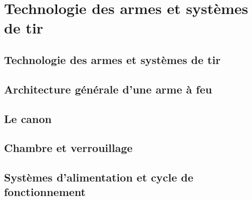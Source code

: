 
\chapter*{}

\cleardoublepage
{}
\renewcommand{\CurrentPartColor}{Part3Color}
\renewcommand{\CurrentPartNumber}{Partie 03}
\renewcommand{\CurrentPartName}{Technologie des armes et systèmes de tir}
\renewcommand{\CurrentChapterType}{Chapitre}


\part{Technologie des armes et systèmes de tir}

    \chapter{Technologie des armes et systèmes de tir}
    \label{chap:introduction_aux_armes}
    

    \chapter{Architecture générale d'une arme à feu}
    \label{chap:architecture_generale}
    

    \chapter{Le canon}
    \label{chap:canon}
    

    \chapter{Chambre et verrouillage}
    \label{chap:chambre_et_verrouillage}
    

    \chapter{Systèmes d'alimentation et cycle de fonctionnement}
    \label{chap:alimentation_et_cycle}
    

